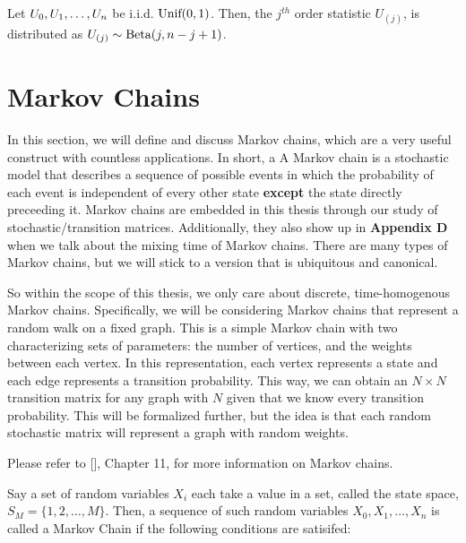 \begin{theorem}
Let $\seq[n]{U}$ be i.i.d. $\Unif(0, 1)$. Then, the $j^{th}$ order statistic $U_{(j)}$, is distributed as $U_{(j)} \sim \Beta(j, n-j+1)$.
\end{theorem}

\newpage
\section{Markov Chains}


In this section, we will define and discuss Markov chains, which are a very useful construct with countless applications.
In short, a A Markov chain is a stochastic model that describes a sequence of possible events in which the probability of each event is independent of every other state \textbf{except} the state directly preceeding it.
Markov chains are embedded in this thesis through our study of stochastic/transition matrices. Additionally, they also show up in \textbf{Appendix D} when we talk about the mixing time of Markov chains.
There are many types of Markov chains, but we will stick to a version that is ubiquitous and canonical.

So within the scope of this thesis, we only care about discrete, time-homogenous Markov chains.
Specifically, we will be considering Markov chains that represent a random walk on a fixed graph.
This is a simple Markov chain with two characterizing sets of parameters: the number of vertices, and the weights between each vertex.
In this representation, each vertex represents a state and each edge represents a transition probability.
This way, we can obtain an $N \times N$ transition matrix for any graph with $N$ given that we know every transition probability.
This will be formalized further, but the idea is that each random stochastic matrix will represent a graph with random weights.

Please refer to [\cite{blitz}], Chapter 11, for more information on Markov chains.

\begin{definition} Say a set of random variables $X_i$ each take a value in a set, called the state space, $S_M = \{1,2,\dots,M\}$. Then, a sequence of such random variables $X_0,X_1,\dots,X_n$ is called a Markov Chain if the following conditions are satisifed:
\end{definition}

